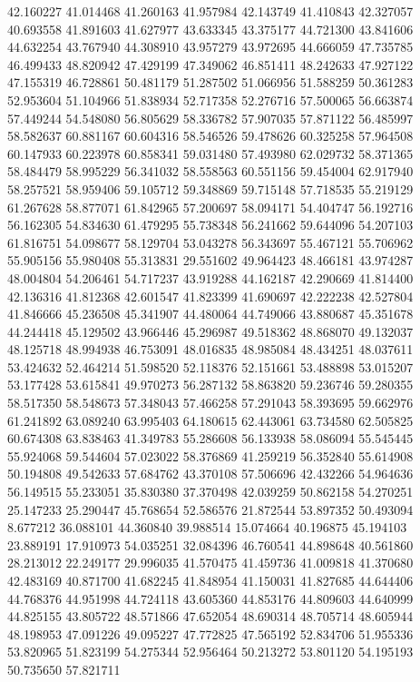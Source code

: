 42.160227
41.014468
41.260163
41.957984
42.143749
41.410843
42.327057
40.693558
41.891603
41.627977
43.633345
43.375177
44.721300
43.841606
44.632254
43.767940
44.308910
43.957279
43.972695
44.666059
47.735785
46.499433
48.820942
47.429199
47.349062
46.851411
48.242633
47.927122
47.155319
46.728861
50.481179
51.287502
51.066956
51.588259
50.361283
52.953604
51.104966
51.838934
52.717358
52.276716
57.500065
56.663874
57.449244
54.548080
56.805629
58.336782
57.907035
57.871122
56.485997
58.582637
60.881167
60.604316
58.546526
59.478626
60.325258
57.964508
60.147933
60.223978
60.858341
59.031480
57.493980
62.029732
58.371365
58.484479
58.995229
56.341032
58.558563
60.551156
59.454004
62.917940
58.257521
58.959406
59.105712
59.348869
59.715148
57.718535
55.219129
61.267628
58.877071
61.842965
57.200697
58.094171
54.404747
56.192716
56.162305
54.834630
61.479295
55.738348
56.241662
59.644096
54.207103
61.816751
54.098677
58.129704
53.043278
56.343697
55.467121
55.706962
55.905156
55.980408
55.313831
29.551602
49.964423
48.466181
43.974287
48.004804
54.206461
54.717237
43.919288
44.162187
42.290669
41.814400
42.136316
41.812368
42.601547
41.823399
41.690697
42.222238
42.527804
41.846666
45.236508
45.341907
44.480064
44.749066
43.880687
45.351678
44.244418
45.129502
43.966446
45.296987
49.518362
48.868070
49.132037
48.125718
48.994938
46.753091
48.016835
48.985084
48.434251
48.037611
53.424632
52.464214
51.598520
52.118376
52.151661
53.488898
53.015207
53.177428
53.615841
49.970273
56.287132
58.863820
59.236746
59.280355
58.517350
58.548673
57.348043
57.466258
57.291043
58.393695
59.662976
61.241892
63.089240
63.995403
64.180615
62.443061
63.734580
62.505825
60.674308
63.838463
41.349783
55.286608
56.133938
58.086094
55.545445
55.924068
59.544604
57.023022
58.376869
41.259219
56.352840
55.614908
50.194808
49.542633
57.684762
43.370108
57.506696
42.432266
54.964636
56.149515
55.233051
35.830380
37.370498
42.039259
50.862158
54.270251
25.147233
25.290447
45.768654
52.586576
21.872544
53.897352
50.493094
8.677212
36.088101
44.360840
39.988514
15.074664
40.196875
45.194103
23.889191
17.910973
54.035251
32.084396
46.760541
44.898648
40.561860
28.213012
22.249177
29.996035
41.570475
41.459736
41.009818
41.370680
42.483169
40.871700
41.682245
41.848954
41.150031
41.827685
44.644406
44.768376
44.951998
44.724118
43.605360
44.853176
44.809603
44.640999
44.825155
43.805722
48.571866
47.652054
48.690314
48.705714
48.605944
48.198953
47.091226
49.095227
47.772825
47.565192
52.834706
51.955336
53.820965
51.823199
54.275344
52.956464
50.213272
53.801120
54.195193
50.735650
57.821711
